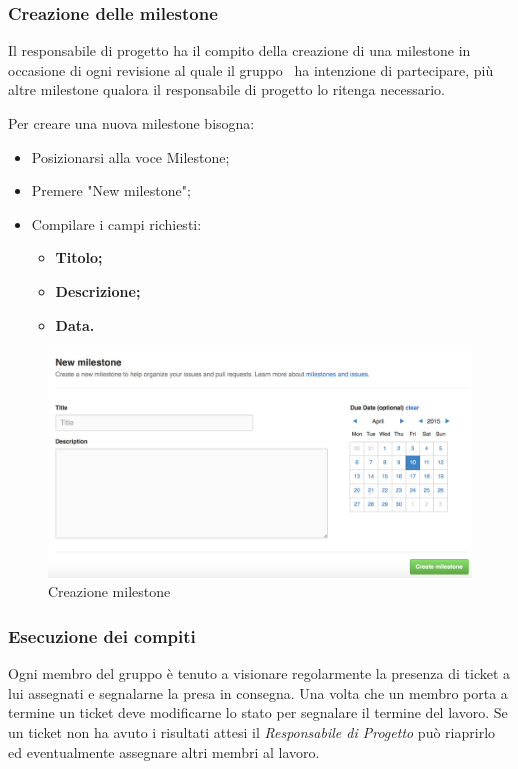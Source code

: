 \newpage
\subsubsection{Creazione delle milestone}

Il responsabile di progetto ha il compito della creazione di una \gls{milestone} in occasione di ogni revisione al quale il gruppo \GRUPPO\ ha intenzione di partecipare, più altre \gls{milestone} qualora il responsabile di progetto lo ritenga necessario.

Per creare una nuova \gls{milestone} bisogna:

\begin{itemize}
	\item Posizionarsi alla voce \gls{Milestone};
	\item Premere "New \gls{milestone}";
	\item Compilare i campi richiesti:
	\begin{itemize}
		\item \textbf{Titolo;}
		\item \textbf{Descrizione;}
		\item \textbf{Data.}
	\end{itemize}
\end{itemize}
\begin{figure}[h]
	\centering
	\includegraphics[width=0.7\linewidth]{img/milestone}
	\caption[Creazione milestone]{Creazione milestone}
	\label{fig:milestone}
\end{figure}

\subsubsection{Esecuzione dei compiti}

Ogni membro del gruppo è tenuto a visionare regolarmente la presenza di \gls{ticket} a lui assegnati e segnalarne la presa in consegna.
Una volta che un membro porta a termine un \gls{ticket} deve modificarne lo stato per segnalare il termine del lavoro.
Se un \gls{ticket} non ha avuto i risultati attesi il \textit{Responsabile di Progetto} può riaprirlo ed eventualmente assegnare altri membri al lavoro.


